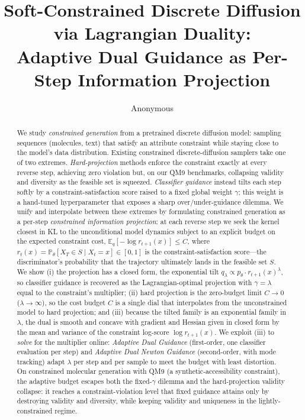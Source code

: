 \documentclass{article}
\title{Soft-Constrained Discrete Diffusion via Lagrangian Duality:\\ Adaptive Dual Guidance as Per-Step Information Projection}
\author{Anonymous}
\date{}
\newcommand{\E}{\mathbb{E}}
\begin{document}
\maketitle

\begin{abstract}
We study \emph{constrained generation} from a pretrained discrete diffusion model: sampling sequences (molecules, text) that satisfy an attribute constraint while staying close to the model's data distribution. Existing constrained discrete-diffusion samplers take one of two extremes. \emph{Hard-projection} methods enforce the constraint exactly at every reverse step, achieving zero violation but, on our QM9 benchmarks, collapsing validity and diversity as the feasible set is squeezed. \emph{Classifier guidance} instead tilts each step softly by a constraint-satisfaction score raised to a fixed global weight $\gamma$; this weight is a hand-tuned hyperparameter that exposes a sharp over/under-guidance dilemma. We unify and interpolate between these extremes by formulating constrained generation as a per-step \emph{constrained information projection}: at each reverse step we seek the kernel closest in KL to the unconditional model dynamics subject to an explicit budget on the expected constraint cost, $\E_q[-\log r_{t+1}(x)]\le C$, where $r_t(x)=\mathbb P_\theta[X_T\in S\mid X_t=x]\in[0,1]$ is the constraint-satisfaction score---the discriminator's probability that the trajectory ultimately lands in the feasible set $S$. We show (i) the projection has a closed form, the exponential tilt $q_\lambda\propto p_\theta\cdot r_{t+1}(x)^\lambda$, so classifier guidance is recovered as the Lagrangian-optimal projection with $\gamma=\lambda$ equal to the constraint's multiplier; (ii) hard projection is the zero-budget limit $C\to0$ ($\lambda\to\infty$), so the cost budget $C$ is a single dial that interpolates from the unconstrained model to hard projection; and (iii) because the tilted family is an exponential family in $\lambda$, the dual is smooth and concave with gradient and Hessian given in closed form by the mean and variance of the constraint log-score $\log r_{t+1}(x)$. We exploit (iii) to \emph{solve} for the multiplier online: \emph{Adaptive Dual Guidance} (first-order, one classifier evaluation per step) and \emph{Adaptive Dual Newton Guidance} (second-order, with mode tracking) adapt $\lambda$ per step and per sample to meet the budget with least distortion. On constrained molecular generation with QM9 (a synthetic-accessibility constraint), the adaptive budget escapes both the fixed-$\gamma$ dilemma and the hard-projection validity collapse: it reaches a constraint-violation level that fixed guidance attains only by destroying validity and diversity, while keeping validity and uniqueness in the lightly-constrained regime.
\end{abstract}
\end{document}
